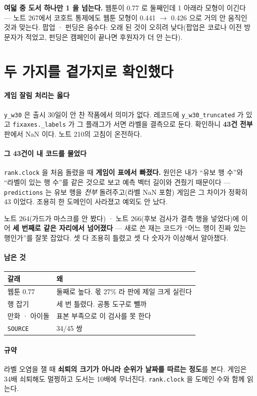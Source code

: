 \documentclass[10pt]{article}
\begin{document}
\textbf{여덟 중 도서 하나만 1 을 넘는다.} 웹툰이 0.77 로 둘째인데 1 아래라
모형이 이긴다 --- 노트 267에서 코호트 통제에도 웹툰 모형이 0.441 $\to$
0.426 으로 거의 안 움직인 것과 맞는다. 팝업 · 펀딩은 음수다: 오래 된 것이
오히려 낮다(팝업은 코로나 이전 방문자가 적었고, 펀딩은 캠페인이 끝나면
후원자가 더 안 는다).

\section{두 가지를 곁가지로 확인했다}

\paragraph{게임 잘림 처리는 옳다} \texttt{y\_w30} 은 출시 30일이 안 찬
작품에서 의미가 없다. 레코드에 \texttt{y\_w30\_truncated} 가 있고
\texttt{fixaxes.\_labels} 가 그 플래그가 서면 라벨을 결측으로 둔다. 확인하니
\textbf{43건 전부} 판에서 NaN 이다. 노트 210의 고침이 온전하다.

\paragraph{그 43건이 내 코드를 물었다} \texttt{rank.clock} 을 처음 돌렸을 때
\textbf{게임이 표에서 빠졌다.} 원인은 내가 ``유보 행 수''와 ``라벨이 있는
행 수''를 같은 것으로 보고 예측 벡터 길이와 견줬기 때문이다 ---
\texttt{predictions} 는 유보 행을 \emph{전부} 돌려주고(라벨 NaN 포함) 게임은
그 차이가 정확히 43 이었다. 조용히 한 도메인이 사라졌고 예외도 안 났다.

노트 264(가드가 마스크를 안 봤다) · 노트 266(후보 검사가 결측 행을 넣었다)에
이어 \textbf{세 번째로 같은 자리에서 넘어졌다} --- 새로 쓴 재는 코드가
``어느 행이 진짜 있는 행인가''를 잘못 잡았다. 셋 다 조용히 틀렸고 셋 다
숫자가 이상해서 알아챘다.

\paragraph{남은 것}
\begin{center}\small
\begin{tabular}{ll}
\hline
갈래 & 왜 \\
\hline
웹툰 0.77 & 둘째로 높다. 몫 27\% 라 판에 제일 크게 실린다 \\
행 잡기 & 세 번 틀렸다. 공통 도구로 뺄까 \\
만화 · 아이돌 & 표본 부족으로 이 검사를 못 한다 \\
\texttt{SOURCE} & 34/45 쌍 \\
\hline
\end{tabular}
\end{center}

\paragraph{규약} 라벨 오염을 잴 때 \textbf{쇠퇴의 크기가 아니라 순위가 날짜를
따르는 정도}를 본다. 게임은 34배 쇠퇴해도 멀쩡하고 도서는 10배에 무너진다.
\texttt{rank.clock} 을 도메인 수와 함께 읽는다.
\end{document}
